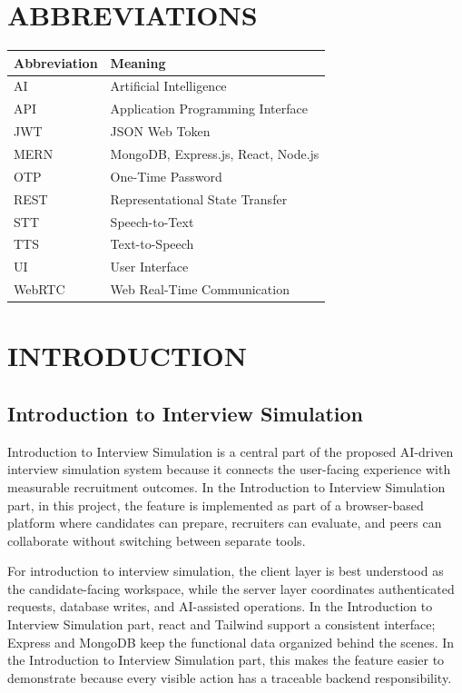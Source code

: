 \documentclass[12pt,a4paper]{report}
\begin{document}
\chapter*{ABBREVIATIONS}
\begin{longtable}{|>{\raggedright\arraybackslash}p{}|>{\raggedright\arraybackslash}p{}|}
\hline
\textbf{Abbreviation} & \textbf{Meaning}\\
\hline
AI & Artificial Intelligence\\\hline
API & Application Programming Interface\\\hline
JWT & JSON Web Token\\\hline
MERN & MongoDB, Express.js, React, Node.js\\\hline
OTP & One-Time Password\\\hline
REST & Representational State Transfer\\\hline
STT & Speech-to-Text\\\hline
TTS & Text-to-Speech\\\hline
UI & User Interface\\\hline
WebRTC & Web Real-Time Communication\\\hline
\end{longtable}

\clearpage
\tableofcontents
\clearpage
\listoffigures
\clearpage
\listoftables
\clearpage
{}
\chapter{INTRODUCTION}

\section{Introduction to Interview Simulation}

Introduction to Interview Simulation is a central part of the proposed AI-driven interview simulation system because it connects the user-facing experience with measurable recruitment outcomes. In the Introduction to Interview Simulation part, in this project, the feature is implemented as part of a browser-based platform where candidates can prepare, recruiters can evaluate, and peers can collaborate without switching between separate tools.


For introduction to interview simulation, the client layer is best understood as the candidate-facing workspace, while the server layer coordinates authenticated requests, database writes, and AI-assisted operations. In the Introduction to Interview Simulation part, react and Tailwind support a consistent interface; Express and MongoDB keep the functional data organized behind the scenes. In the Introduction to Interview Simulation part, this makes the feature easier to demonstrate because every visible action has a traceable backend responsibility.
\end{document}
